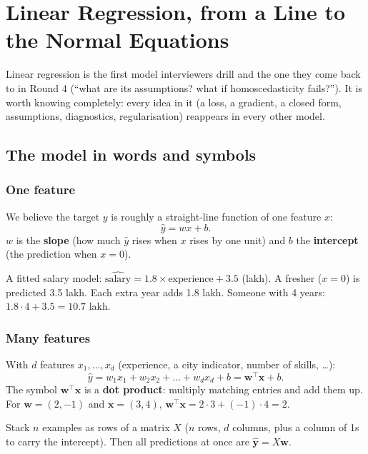 \chapter{Linear Regression, from a Line to the Normal Equations}

Linear regression is the first model interviewers drill and the one they come back to in Round 4
(``what are its assumptions? what if homoscedasticity fails?''). It is worth knowing completely: every idea
in it (a loss, a gradient, a closed form, assumptions, diagnostics, regularisation) reappears in every other
model.

\section{The model in words and symbols}

\subsection{One feature}
We believe the target $y$ is roughly a straight-line function of one feature $x$:
\[ \hat y = w x + b. \]
$w$ is the \textbf{slope} (how much $\hat y$ rises when $x$ rises by one unit) and $b$ the \textbf{intercept}
(the prediction when $x = 0$).

\begin{example}
A fitted salary model: $\widehat{\text{salary}} = 1.8\times\text{experience} + 3.5$ (lakh). A fresher ($x=0$) is
predicted 3.5 lakh. Each extra year adds 1.8 lakh. Someone with 4 years: $1.8\cdot4+3.5 = 10.7$ lakh.
\end{example}

\subsection{Many features}
With $d$ features $x_1,\dots,x_d$ (experience, a city indicator, number of skills, \dots):
\[ \hat y = w_1x_1 + w_2x_2 + \dots + w_dx_d + b = \mathbf{w}^\top\mathbf{x} + b. \]
The symbol $\mathbf{w}^\top\mathbf{x}$ is a \textbf{dot product}: multiply matching entries and add them up.
For $\mathbf{w} = (2, -1)$ and $\mathbf{x} = (3, 4)$, $\mathbf{w}^\top\mathbf{x} = 2\cdot3 + (-1)\cdot4 = 2$.

Stack $n$ examples as rows of a matrix $X$ ($n$ rows, $d$ columns, plus a column of 1s to carry the
intercept). Then all predictions at once are $\hat{\mathbf y} = X\mathbf w$.

